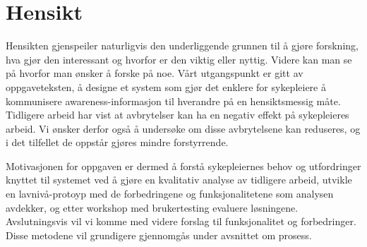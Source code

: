 \section{Hensikt}
\label{chp: hensikt}

Hensikten gjenspeiler naturligvis den underliggende grunnen til å gjøre forskning, hva gjør den interessant og hvorfor er den viktig eller nyttig. Videre kan man se på hvorfor man ønsker å forske på noe. Vårt utgangspunkt er gitt av oppgaveteksten, å designe et system som gjør det enklere for sykepleiere å kommunisere awareness-informasjon til hverandre på en hensiktsmessig måte. Tidligere arbeid har vist at avbrytelser kan ha en negativ effekt på sykepleieres arbeid. Vi ønsker derfor også å undersøke om disse avbrytelsene kan reduseres, og i det tilfellet de oppstår gjøres mindre forstyrrende. 

\noindent
Motivasjonen for oppgaven er dermed å forstå sykepleiernes behov og utfordringer knyttet til systemet ved å gjøre en kvalitativ analyse av tidligere arbeid, utvikle en lavnivå-protoyp med de forbedringene og funksjonalitetene som analysen avdekker, og etter workshop med brukertesting evaluere løsningene. Avslutningsvis vil vi komme med videre forslag til funksjonalitet og forbedringer. Disse metodene vil grundigere gjennomgås under avsnittet om prosess. 